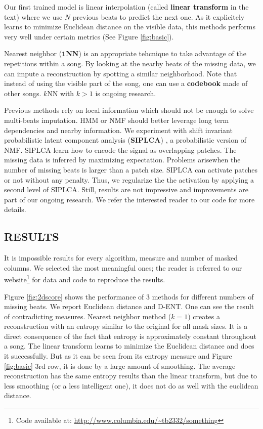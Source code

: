 \documentclass{article}
\begin{document}
Our first trained model is linear interpolation (called \textbf{linear
  transform} in the text) where we use $N$ previous beats to predict
the next one.  As it explicitely learns to minimize Euclidean distance
on the visible data, this methods performs very well under certain
metrics (See Figure \ref{fig:basic}).

Nearest neighbor ($\mathbf{1}$\textbf{NN}) is an appropriate tehcnique
to take advantage of the repetitions within a song. By looking at the
nearby beats of the missing data, we can impute a reconstruction by
spotting a similar neighborhood. Note that instead of using the
visible part of the song, one can use a \textbf{codebook} made of
other songs.  $k$NN with $k>1$ is ongoing research.

Previous methods rely on local information which should not be enough
to solve multi-beats imputation. HMM or NMF should better leverage
long term dependencies and nearby information.  We experiment with
shift invariant probabilistic latent component analysis
(\textbf{SIPLCA}) \cite{Smaragdis2009,Weiss2010}, a probabilistic
version of NMF. SIPLCA learn how to encode the signal as overlapping
patches. The missing data is inferred by maximizing expectation.
Problems arisewhen the number of missing beats is larger than a patch
size. SIPLCA can activate patches or not without any penalty. Thus, we
regularize the the activation by applying a second level of SIPLCA.
Still, results are not impressive and improvements are part of our
ongoing research. We refer the interested reader to our code for more
details.



\subsection{RESULTS}
\label{ssec:results}
It is impossible results for every algorithm, measure and number of masked columns.
We selected the most meaningful ones; the reader is referred to our 
website\footnote{Code available at: \url{http://www.columbia.edu/~tb2332/something}}
for data and code to reproduce the results.

Figure \ref{fig:2dscore} shows the performance of $3$ methods for different numbers
of missing beats. We report Euclidean distance and D-ENT. One can see the result
of contradicting measures. Nearest neighbor method ($k=1$) creates a reconstruction
with an entropy similar to the original for all mask sizes. It is a direct consequence
of the fact that entropy is approximately constant throughout a song. The linear
transform learns to minimize the Euclidean distance and does it successfully. But as it
can be seen from its entropy measure and Figure \ref{fig:basic} $3$rd row, it is
done by a large amount of smoothing. The average reconstruction has the same entropy
results than the linear transform, but due to less smoothing (or a less intelligent
one), it does not do as well with the euclidean distance.
\end{document}
